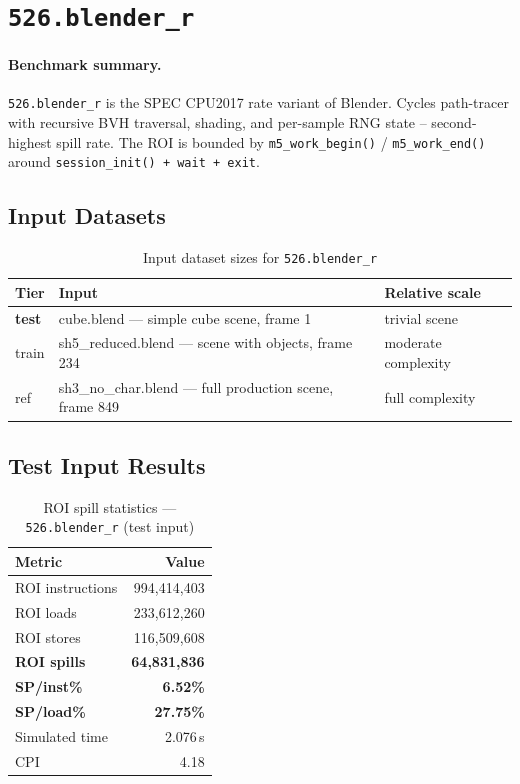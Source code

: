 \documentclass[11pt,a4paper]{article}
\begin{document}
\section{\texttt{526.blender\_r}}
\label{sec:blender}

\paragraph{Benchmark summary.}
\texttt{526.blender\_r} is the SPEC CPU2017 rate variant of Blender.
Cycles path-tracer with recursive BVH traversal, shading, and per-sample RNG state -- second-highest spill rate.
The ROI is bounded by \texttt{m5\_work\_begin()} / \texttt{m5\_work\_end()}
around \texttt{session\_init() + wait + exit}.

\subsection{Input Datasets}

\begin{table}[H]
\centering
\caption{Input dataset sizes for \texttt{526.blender\_r}}
\label{tab:blender_inputs}
\small
\begin{tabular}{lp{8cm}l}
\toprule
\textbf{Tier} & \textbf{Input} & \textbf{Relative scale} \\
\midrule
\textbf{test} & cube.blend --- simple cube scene, frame 1 & trivial scene \\
train & sh5\_reduced.blend --- scene with objects, frame 234 & moderate complexity \\
ref & sh3\_no\_char.blend --- full production scene, frame 849 & full complexity \\
\bottomrule
\end{tabular}
\end{table}

\subsection{Test Input Results}

\begin{table}[H]
\centering
\caption{ROI spill statistics --- \texttt{526.blender\_r} (test input)}
\label{tab:blender_test_roi}
\begin{tabular}{lr}
\toprule
\textbf{Metric} & \textbf{Value} \\
\midrule
ROI instructions & 994,414,403 \\
ROI loads        & 233,612,260 \\
ROI stores       & 116,509,608 \\
\textbf{ROI spills}   & \textbf{64,831,836} \\
\textbf{SP/inst\%}   & \textbf{6.52\%} \\
\textbf{SP/load\%}   & \textbf{27.75\%} \\
Simulated time   & 2.076\,s \\
CPI              & 4.18 \\
\bottomrule
\end{tabular}
\end{table}
\end{document}
